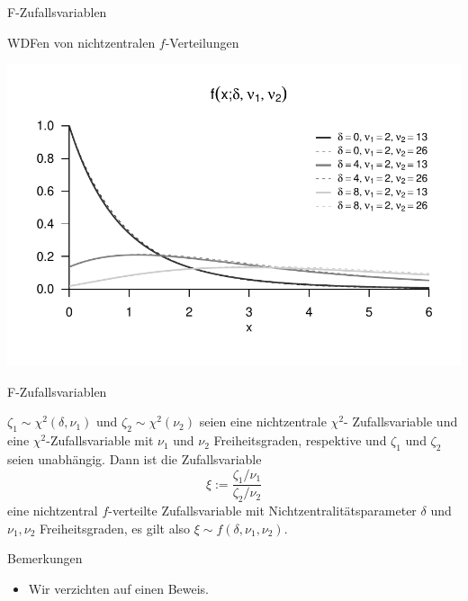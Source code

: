 \documentclass[
  8pt,
  ignorenonframetext,
]{beamer}
\providecommand{\tightlist}{%
  \setlength{\itemsep}{0pt}\setlength{\parskip}{0pt}}
\begin{document}
\begin{frame}{F-Zufallsvariablen}
\protect\hypertarget{f-zufallsvariablen-4}{}
\vfill

\small

WDFen von nichtzentralen \(f\)-Verteilungen \vspace{1mm}

\begin{center}\includegraphics[width=0.8\linewidth]{8_Abbildungen/alm_8_f_nichtzentral_wdf} \end{center}
\end{frame}

\begin{frame}{F-Zufallsvariablen}
\protect\hypertarget{f-zufallsvariablen-5}{}
\small
\begin{theorem}
\justifying
\normalfont
$\zeta_1 \sim \chi^2(\delta,\nu_1)$ und $\zeta_2 \sim \chi^2(\nu_2)$ seien eine nichtzentrale $\chi^2$-
Zufallsvariable und eine  $\chi^2$-Zufallsvariable mit $\nu_1$ und $\nu_2$ Freiheitsgraden,
respektive und $\zeta_1$ und $\zeta_2$ seien unabhängig. Dann ist die Zufallsvariable
\begin{equation}
\xi := \frac{\zeta_1/\nu_1}{\zeta_2/\nu_2}
\end{equation}
eine nichtzentral $f$-verteilte Zufallsvariable mit Nichtzentralitätsparameter
$\delta$  und $\nu_1,\nu_2$ Freiheitsgraden, es gilt also $\xi \sim f(\delta, \nu_1,\nu_2)$.
\end{theorem}

\footnotesize

Bemerkungen

\begin{itemize}
\tightlist
\item
  Wir verzichten auf einen Beweis.
\end{itemize}
\end{frame}
\end{document}
